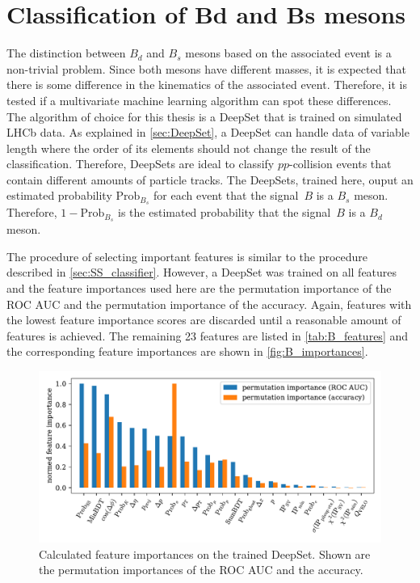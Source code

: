 \section{Classification of Bd and Bs mesons}

The distinction between $B_d$ and $B_s$ mesons based on the associated event is a non-trivial problem.
Since both mesons have different masses, it is expected that there is some difference in the kinematics of the associated event.
Therefore, it is tested if a multivariate machine learning algorithm can spot these differences.
The algorithm of choice for this thesis is a DeepSet that is trained on simulated LHCb data.
As explained in \autoref{sec:DeepSet}, a DeepSet can handle data of variable length where the order of its elements should not change the result of the classification.
Therefore, DeepSets are ideal to classify $pp$-collision events that contain different amounts of particle tracks.
The DeepSets, trained here, ouput an estimated probability $\text{Prob}_{B_s}$ for each event that the signal~$B$ is a $B_s$ meson.
Therefore, $1-\text{Prob}_{B_s}$ is the estimated probability that the signal~$B$ is a $B_d$ meson.

The procedure of selecting important features is similar to the procedure described in \autoref{sec:SS_classifier}.
However, a DeepSet was trained on all features and the feature importances used here are the permutation importance of the ROC AUC and the permutation importance of the accuracy.
Again, features with the lowest feature importance scores are discarded until a reasonable amount of features is achieved.
The remaining 23 features are listed in \autoref{tab:B_features} and the corresponding feature importances are shown in \autoref{fig:B_importances}.

\begin{figure}
    \centering
    \includegraphics[width=\textwidth]{images/B_feature_importances.pdf}
    \caption{Calculated feature importances on the trained DeepSet. Shown are the permutation importances of the ROC AUC and the accuracy.}
    \label{fig:B_importances}
\end{figure}

